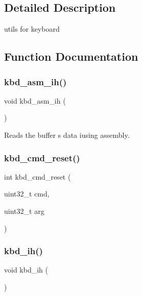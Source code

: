 \subsection{Detailed Description}
utils for keyboard 

\subsection{Function Documentation}
\mbox{\label{group__keyboard_gad89ba783e5c20d2626d7d68921339235}} 
\subsubsection{\texorpdfstring{kbd\_asm\_ih()}{kbd\_asm\_ih()}}
{\footnotesize\ttfamily void kbd\+\_\+asm\+\_\+ih (\begin{DoxyParamCaption}{ }\end{DoxyParamCaption})}



Reads the buffer s data iusing assembly. 

\mbox{\label{group__keyboard_ga7c34e9167923607131568a4ec42859a5}} 
\subsubsection{\texorpdfstring{kbd\_cmd\_reset()}{kbd\_cmd\_reset()}}
{\footnotesize\ttfamily int kbd\+\_\+cmd\+\_\+reset (\begin{DoxyParamCaption}\item[{uint32\+\_\+t}]{cmd,  }\item[{uint32\+\_\+t}]{arg }\end{DoxyParamCaption})}

\mbox{\label{group__keyboard_ga3b35eecf289446fe614818dd6ab6d5bf}} 
\subsubsection{\texorpdfstring{kbd\_ih()}{kbd\_ih()}}
{\footnotesize\ttfamily void kbd\+\_\+ih (\begin{DoxyParamCaption}{ }\end{DoxyParamCaption})}



